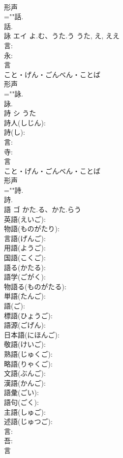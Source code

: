 \documentclass[8pt]{extreport}
\begin{document}
\begin{CJK}{UTF8}{min}
\\	形声 
\\	=""話.
\\	話.
\\	詠	エイ	よ.む、うた.う	うた, え, ええ	
\\	言: 
\\	永: 
\\	言	
\\	こと・げん・ごんべん・ことば	
\\	形声 
\\	=""詠.
\\	詠.
\\	詩	シ	うた		
\\	詩人(しじん): 
\\	詩(し): 
\\	言: 
\\	寺: 
\\	言	
\\	こと・げん・ごんべん・ことば	
\\	形声 
\\	=""詩.
\\	詩.
\\	語	ゴ	かた.る、かた.らう		
\\	英語(えいご): 
\\	物語(ものがたり): 
\\	言語(げんご): 
\\	用語(ようご): 
\\	国語(こくご): 
\\	語る(かたる): 
\\	語学(ごがく): 
\\	物語る(ものがたる): 
\\	単語(たんご): 
\\	語(ご): 
\\	標語(ひょうご): 
\\	語源(ごげん): 
\\	日本語(にほんご): 
\\	敬語(けいご): 
\\	熟語(じゅくご): 
\\	略語(りゃくご): 
\\	文語(ぶんご): 
\\	漢語(かんご): 
\\	語彙(ごい): 
\\	語句(ごく): 
\\	主語(しゅご): 
\\	述語(じゅつご): 
\\	言: 
\\	吾: 
\\	言	

\end{CJK}
\end{document}
